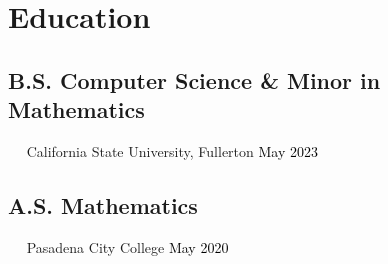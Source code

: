\documentclass{article}
\newcommand{\resumesection}[3]{
    \subsection*{#1}
    \ 
    \ 
    \small
    \textcolor{csufgrey}{#2}
    \normalsize
    \hfill
    \textcolor{black}{#3}
    \normalsize
}
\begin{document}
\pagestyle{useheader}

\section*{Education}
\resumesection{B.S. Computer Science \& Minor in Mathematics}{California State University, Fullerton}{May 2023}%
\resumesection{A.S. Mathematics}{Pasadena City College}{May 2020}
\end{document}
